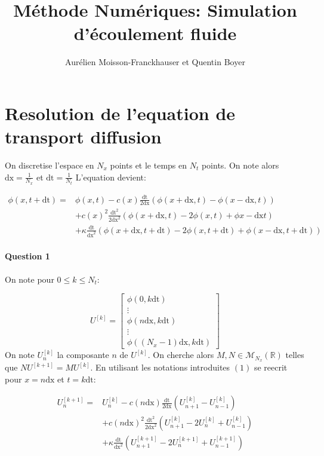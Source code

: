 \documentclass{article}
\newcommand{\dx}{\mathrm{dx}}
\newcommand{\dt}{\mathrm{dt}}
\begin{document}
\title{Méthode Numériques: Simulation d'écoulement fluide}
\author{Aurélien Moisson-Franckhauser et Quentin Boyer}
\maketitle

\section{Resolution de l'equation de transport diffusion}

On discretise l'espace en $N_x$ points et le temps en $N_t$ points. On note alors $\mathrm{dx}=\frac{1}{N_x}$ et $\mathrm{dt}=\frac{1}{N_t}$
L'equation devient:


\begin{equation}
	\begin{aligned}
	\phi(x,t+\dt) ={} & \phi(x,t)-c(x)\frac{\dt}{2\dx}(\phi(x+\dx, t)-\phi(x-\dx,t)) \\
					&+c{(x)}^2\frac{\dt^{2}}{2\dx^{2}}(\phi(x+\dx,t)-2\phi(x, t)+\phi{x-\dx}{t}) \\
					&+\kappa\frac{\dt}{\dx^2}(\phi(x+\dx,t+\dt)-2\phi(x,t+\dt)+\phi(x-\dx,t+\dt))
	\end{aligned}
\end{equation}


\paragraph{Question 1}
On note pour $0 \leq k \le N_t$:

\[U^{[k]}=
\begin{bmatrix}
	\phi(0, k\dt) \\
	\vdots \\
	\phi(n\dx, k\dt) \\
	\vdots \\
	\phi((N_x-1)\dx, k\dt)
\end{bmatrix}
\]
On note $U_n^{[k]}$ la composante $n$ de $U^{[k]}$. On cherche alors $ M,N \in \mathcal{M}_{N_x}(\mathbb{R})$ telles que $NU^{[k+1]}=MU^{[k]}$.
En utilisant les notations introduites $(1)$ se reecrit pour $x=n\dx$ et $t=k\dt$:

\[
	\begin{aligned}
		U^{[k+1]}_n ={} & U_n^{[k]} - c(n\dx)\frac{\dt}{2\dx}(U_{n+1}^{[k]}-U_{n-1}^{[k]}) \\
		& +c{(n\dx)}^2\frac{\dt^{2}}{2\dx^{2}}(U_{n+1}^{[k]}-2U_{n}^{[k]}+U_{n-1}^{[k]}) \\
						& +\kappa\frac{\dt}{\dx^2}(U_{n+1}^{[k+1]}-2U_{n}^{[k+1]}+U_{n-1}^{[k+1]})
	\end{aligned}
\]
\end{document}
